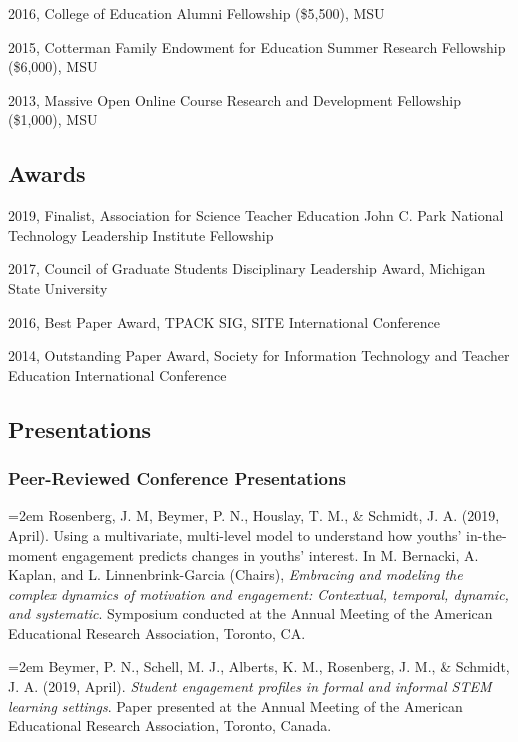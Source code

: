 \documentclass[14,]{article}
\begin{document}
2016, College of Education Alumni Fellowship (\$5,500), MSU

2015, Cotterman Family Endowment for Education Summer Research
Fellowship (\$6,000), MSU

2013, Massive Open Online Course Research and Development Fellowship
(\$1,000), MSU

\subsection{Awards}\label{awards}

2019, Finalist, Association for Science Teacher Education John C. Park
National Technology Leadership Institute Fellowship

2017, Council of Graduate Students Disciplinary Leadership Award,
Michigan State University

2016, Best Paper Award, TPACK SIG, SITE International Conference

2014, Outstanding Paper Award, Society for Information Technology and
Teacher Education International Conference

\subsection{Presentations}\label{presentations}

\subsubsection{Peer-Reviewed Conference
Presentations}\label{peer-reviewed-conference-presentations}

\hangindent=2em Rosenberg, J. M, Beymer, P. N., Houslay, T. M., \&
Schmidt, J. A. (2019, April). Using a multivariate, multi-level model to
understand how youths' in-the-moment engagement predicts changes in
youths' interest. In M. Bernacki, A. Kaplan, and L. Linnenbrink-Garcia
(Chairs), \emph{Embracing and modeling the complex dynamics of
motivation and engagement: Contextual, temporal, dynamic, and
systematic}. Symposium conducted at the Annual Meeting of the American
Educational Research Association, Toronto, CA.

\hangindent=2em Beymer, P. N., Schell, M. J., Alberts, K. M., Rosenberg,
J. M., \& Schmidt, J. A. (2019, April). \emph{Student engagement
profiles in formal and informal STEM learning settings}. Paper presented
at the Annual Meeting of the American Educational Research Association,
Toronto, Canada.
\end{document}
